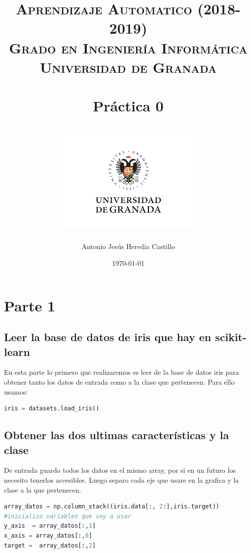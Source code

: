 \documentclass[12pt,a4paper]{article}
\title{
\normalfont \normalsize 
\textsc{{\bf Aprendizaje Automatico (2018-2019)} \\ Grado en Ingeniería Informática \\ Universidad de Granada} \\ [25pt] %
\horrule{0.5pt} \\[0.4cm] %
\huge Práctica 0 \\ %
\horrule{2pt} \\[0.5cm] %
\includegraphics{images/logo.png}	
}
\author{Antonio Jesús Heredia Castillo} %
\date{\normalsize\today} %
\begin{document}
\maketitle %
\newpage %
\tableofcontents %
\listoffigures
\newpage

\section{Parte 1}
\subsection{Leer la base de datos de iris que hay en scikit-learn}
En esta parte lo primero que realizaremos es leer de la base de datos iris para obtener tanto los datos de entrada como a la clase que pertenecen. Para ello usamos:
\begin{lstlisting}[language=Python]
iris = datasets.load_iris()
\end{lstlisting}
\subsection{Obtener las dos ultimas características y la clase}
De entrada guardo todos los datos en el mismo array, por si en un futuro los necesito tenerlos accesibles. Luego separo cada eje que usare en la grafica y la clase a la que pertenecen.
\begin{lstlisting}[language=Python]
array_datos = np.column_stack((iris.data[:, 2:],iris.target))
#inicializo variables que voy a usar
y_axis  = array_datos[:,1]
x_axis = array_datos[:,0]
target =  array_datos[:,2]\end{lstlisting}
\end{document}
